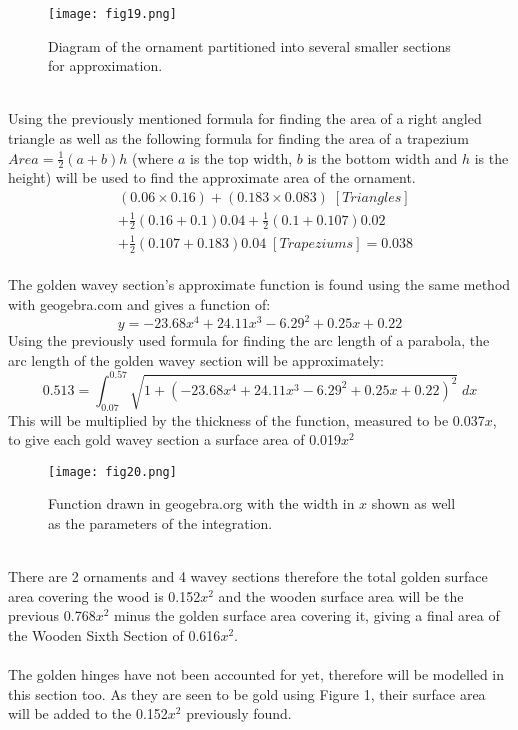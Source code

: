 \documentclass[a4paper,12pt]{article}
\begin{document}
\begin{figure}[h!]
\centering
\texttt{[image: fig19.png]}
\caption{Diagram of the ornament partitioned into several smaller sections for approximation.}
\label{fig:clock19}
\end{figure}
\\Using the previously mentioned formula for finding the area of a right angled triangle as well as the following formula for finding the area of a trapezium $Area=\frac{1}{2}(a+b)h$ (where $a$ is the top width, $b$ is the bottom width and $h$ is the height) will be used to find the approximate area of the ornament.
\begin{equation}
\begin{aligned} 
&(0.06\times0.16)+(0.183\times0.083)\;[Triangles]\\&+\frac{1}{2}(0.16+0.1)0.04+\frac{1}{2}(0.1+0.107)0.02\\&+\frac{1}{2}(0.107+0.183)0.04\;[Trapeziums]=0.038
\end{aligned}
\end{equation}
\\The golden wavey section's approximate function is found using the same method with geogebra.com and gives a function of: $$y=-23.68x^4+24.11x^3-6.29^2+0.25x+0.22$$
Using the previously used formula for finding the arc length of a parabola, the arc length of the golden wavey section will be approximately: $$0.513=\int_{0.07}^{0.57}{\sqrt{1+(-23.68x^4+24.11x^3-6.29^2+0.25x+0.22)^2}}\;dx$$ This will be multiplied by the thickness of the function, measured to be 0.037$x$, to give each gold wavey section a surface area of 0.019$x^2$ 
\begin{figure}[h!]
\centering
\texttt{[image: fig20.png]}
\caption{Function drawn in geogebra.org with the width in $x$ shown as well as the parameters of the integration.}
\label{fig:clock20}
\end{figure}\\There are 2 ornaments and 4 wavey sections therefore the total golden surface area covering the wood is 0.152$x^2$ and the wooden surface area will be the previous 0.768$x^2$ minus the golden surface area covering it, giving a final area of the Wooden Sixth Section of 0.616$x^2$.\\\\The golden hinges have not been accounted for yet, therefore will be modelled in this section too. As they are seen to be gold using Figure 1, their surface area will be added to the 0.152$x^2$ previously found.
\end{document}
